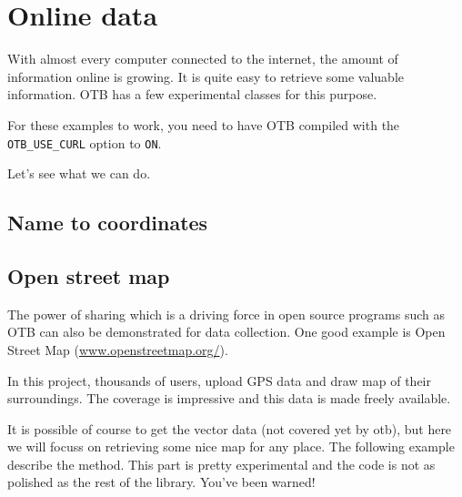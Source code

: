 \chapter{Online data}\label{sec:Online}

With almost every computer connected to the internet, the amount
of information online is growing. It is quite easy to retrieve some
valuable information. OTB has a few experimental classes for this purpose.

For these examples to work, you need to have OTB compiled with the
\texttt{OTB_USE_CURL} option to \texttt{ON}.

Let's see what we can do.

\section{Name to coordinates}
\label{sec:NamesToCoordinates}



\section{Open street map}
\label{sec:OpenStreetMap}

The power of sharing which is a driving force in open source programs such
as OTB can also be demonstrated for data collection. One good example is
Open Street Map (\url{www.openstreetmap.org/}).

In this project, thousands of users, upload GPS data and draw map of their
surroundings. The coverage is impressive and this data is made freely available.

It is possible of course to get the vector data (not covered yet by otb), but
here we will focuss on retrieving some nice map for any place. The following
example describe the method. This part is pretty experimental and the code is
not as polished as the rest of the library. You've been warned!



